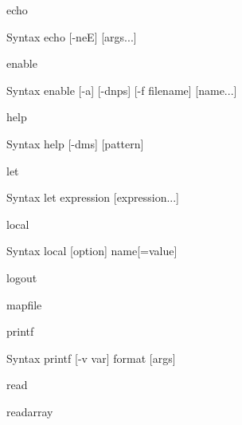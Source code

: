 \documentclass[10pt, compress, aspectratio=169]{beamer}
\begin{document}
\begin{frame}{echo}
  \begin{alertblock}{Syntax}
    echo [-neE] [args...]
  \end{alertblock}
\end{frame}

\begin{frame}{enable}
  \begin{alertblock}{Syntax}
    enable [-a] [-dnps] [-f filename] [name...]
  \end{alertblock}
\end{frame}

\begin{frame}{help}
  \begin{alertblock}{Syntax}
    help [-dms] [pattern]
  \end{alertblock}
\end{frame}

\begin{frame}{let}
  \begin{alertblock}{Syntax}
    let expression [expression...]
  \end{alertblock}
\end{frame}

\begin{frame}{local}
  \begin{alertblock}{Syntax}
    local [option] name[=value]
  \end{alertblock}
\end{frame}

\begin{frame}{logout}
\end{frame}

\begin{frame}{mapfile}
\end{frame}

\begin{frame}{printf}
  \begin{alertblock}{Syntax}
    printf [-v var] format [args]
  \end{alertblock}
\end{frame}

\begin{frame}{read}

\end{frame}

\begin{frame}{readarray}
\end{frame}
\end{document}
